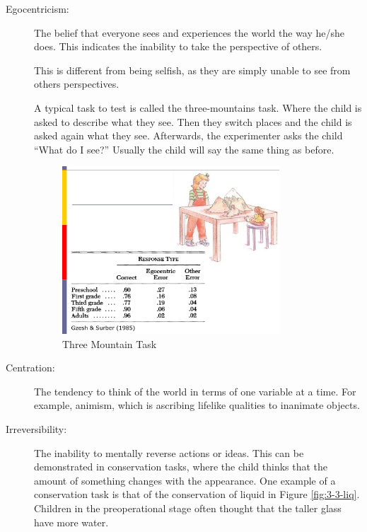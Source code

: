 \documentclass[../main/main.tex]{subfiles}
\begin{document}
\begin{description}
  \item[Egocentricism:] The belief that everyone sees and experiences the world the way he/she does. This indicates the inability to take the perspective of others. 
        \begin{remark}
This is different from being selfish, as they are simply unable to see from others perspectives.
        \end{remark}
        A typical task to test is called the three-mountains task. Where the child is asked to describe what they see. Then they switch places and the child is asked again what they see. Afterwards, the experimenter asks the child ``What do I see?'' Usually the child will say the same thing as before.

        \begin{figure}[htpb]
          \centering
          \includegraphics[width=0.8\textwidth]{../images/3-mount.png}
          \caption{Three Mountain Task}
          \label{fig:3mount}
        \end{figure}

\item[Centration:] The tendency to think of the world in terms of one variable at a time. For example, animism, which is ascribing lifelike qualities to inanimate objects.
\item[Irreversibility:] The inability to mentally reverse actions or ideas. This can be demonstrated in conservation tasks, where the child thinks that the amount of something changes with the appearance. One example of a conservation task is that of the conservation of liquid in Figure \ref{fig:3-3-liq}. Children in the preoperational stage often thought that the taller glass have more water.\\


\end{description}
\end{document}
